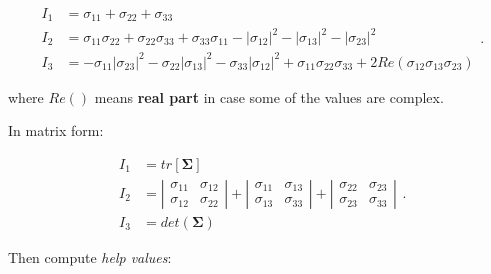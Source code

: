 \begin{itemize}
        \begin{equation}
            \begin{array}{ll}
                I_{1} &= \sigma_{11} + \sigma_{22} + \sigma_{33} \\
                I_{2} &= \sigma_{11}\sigma_{22} + \sigma_{22}\sigma_{33} + \sigma_{33}\sigma_{11}
                - \left|\sigma_{12}\right|^{2}
                - \left|\sigma_{13}\right|^{2}
                - \left|\sigma_{23}\right|^{2} \\
                I_{3}
                &=
                - \sigma_{11}\left|\sigma_{23}\right|^{2}
                - \sigma_{22}\left|\sigma_{13}\right|^{2}
                - \sigma_{33}\left|\sigma_{12}\right|^{2}
                + \sigma_{11}\sigma_{22}\sigma_{33}
                + 2Re\left(\sigma_{12}\sigma_{13}\sigma_{23}\right)
            \end{array}
        .\end{equation}

        where $ Re() $ means \textbf{real part} in case some of the values are complex.

        In matrix form:

        \begin{equation}
            \begin{array}{ll}
                I_{1} &= tr[\mathbf{\Sigma}] \\
                I_{2} &= \left| \begin{matrix}
                    \sigma_{11} & \sigma_{12} \\
                    \sigma_{12} & \sigma_{22}
                \end{matrix} \right| + \left| \begin{matrix}
                    \sigma_{11} & \sigma_{13} \\
                    \sigma_{13} & \sigma_{33}
                \end{matrix} \right| + \left| \begin{matrix}
                    \sigma_{22} & \sigma_{23} \\
                    \sigma_{23} & \sigma_{33}
                \end{matrix} \right| \\
                    I_{3} &= det(\mathbf{\Sigma})
            \end{array}
        .\end{equation}

        Then compute \textit{help values}:


\end{itemize}
